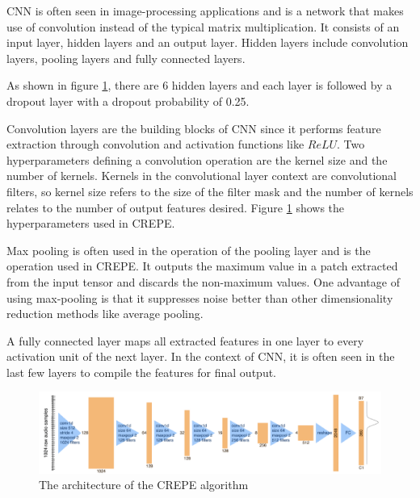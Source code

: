 \begin{enumerate}
    CNN is often seen in image-processing applications and is a network that makes use of convolution instead of the typical matrix multiplication.
    It consists of an input layer, hidden layers and an output layer. Hidden layers include convolution layers, pooling layers and fully connected layers.
    
    As shown in figure \ref{CREPE}, there are 6 hidden layers and each layer is followed by a dropout layer with a dropout probability of 0.25. 

    Convolution layers are the building blocks of CNN since it performs feature extraction through convolution and activation functions like $ReLU$.
    Two hyperparameters defining a convolution operation are the kernel size and the number of kernels. Kernels in the convolutional layer context are convolutional
    filters, so kernel size refers to the size of the filter mask and the number of kernels relates to the number of output features desired. Figure \ref{CREPE} shows the hyperparameters
    used in CREPE.

    Max pooling is often used in the operation of the pooling layer and is the operation used in CREPE. It outputs the maximum value in a patch extracted from the
    input tensor and discards the non-maximum values. 
    One advantage of using max-pooling is that it suppresses noise better than other dimensionality reduction methods like average pooling.

    A fully connected layer maps all extracted features in one layer to every activation unit of the next layer. In the context of CNN, it is often seen in the
    last few layers to compile the features for final output.

    \begin{figure}
        \centering
        \includegraphics[width=0.8\columnwidth]{Figures/CREPE.png}
        \caption{The architecture of the CREPE algorithm}
        \label{CREPE}
    \end{figure}

\end{enumerate}

